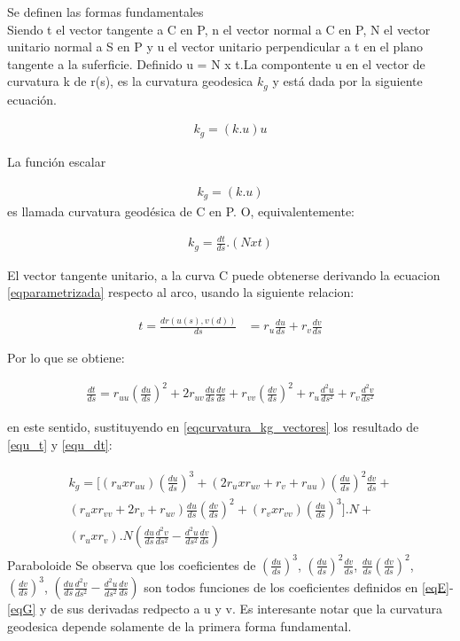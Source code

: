 \documentclass{endm}
\begin{document}
Se definen las formas fundamentales\\

Siendo t el vector tangente a C en P, n el vector normal a C en P, N el vector unitario normal a S en P y u el vector unitario perpendicular a t en el plano tangente a la suferficie. Definido u = N x t.La compontente u en el vector de curvatura k de r(s), es la curvatura geodesica $k_g$ y est\'a dada por la siguiente ecuaci\'on.

\begin{align} 
k_g = (k.u)u
 \label{eqcurvatura_k_g}
\end{align}

La funci\'on escalar

\begin{align} 
k_g = (k.u)
 \label{eqcurvatura_kg}
\end{align}
es llamada curvatura geod\'esica de C en P.
O, equivalentemente:

\begin{align} 
k_g = \frac{dt}{ds} . (N x t)
 \label{eqcurvatura_kg_vectores}
\end{align}

El vector tangente unitario, a la curva C puede obtenerse derivando la ecuacion \ref{eqparametrizada} respecto al arco, usando la siguiente relacion:

\begin{align} 
t = \frac{d r(u(s), v(d))}{ds}&=r_u \frac{d u}{ds} + r_v \frac{d v}{ds}
 \label{equ_t}
\end{align}

Por lo que se obtiene:

\begin{align} 
 \frac{d t}{ds} = r_{uu} (\frac{d u}{ds})^2 +
 2 r_{uv} \frac{d u}{ds} \frac{d v}{ds}
 + r_{vv} (\frac{d v}{ds})^2 +
 r_u \frac{d^2 u}{ds^2} +
 r_v \frac{d^2 v}{ds^2}
 \label{equ_dt}
\end{align}

en este sentido, sustituyendo en \ref{eqcurvatura_kg_vectores} los resultado de \ref{equ_t} y \ref{equ_dt}:

\begin{align} 
\begin{split}
k_g = [ 
(r_u x r_{uu}) (\frac{d u}{ds})^3 + 
(2 r_u x r_{uv} + r_v + r_{uu} ) (\frac{d u}{ds})^2 \frac{dv}{ds} + \\
(r_u x r_{vv} + 2 r_v + r_{uv})  \frac{d u}{ds} (\frac{d v}{ds})^2 + 
(r_v x r_{vv}) (\frac{d u}{ds})^3
] . N + \\
(r_u x r_{v}) . N (\frac{d u}{ds} \frac{d^2 v}{ds^2} - \frac{d^ 2 u}{ds^2 } \frac{d v}{ds})
\label{curvatura_conR}
\end{split}
\end{align}
Paraboloide 
Se observa que los coeficientes de $(\frac{d u}{ds})^3$, 
$(\frac{d u}{ds})^2 \frac{d v}{ds}$, $\frac{d u}{ds} (\frac{d v}{ds})^2$,  
$(\frac{d v}{ds})^3$,
$(\frac{d u}{ds} \frac{d^2 v}{ds^2} - \frac{d^2 u}{ds^2} \frac{d v}{ds} ) $
son todos funciones de los coeficientes definidos en \ref{eqE}-\ref{eqG} y de sus derivadas redpecto a u y v. Es interesante notar que la curvatura geodesica depende solamente de la primera forma fundamental.
\end{document}

